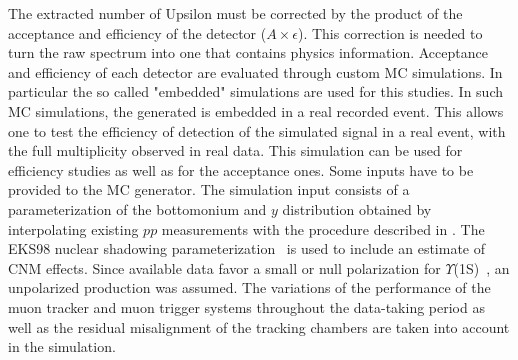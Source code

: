 The extracted number of Upsilon must be corrected by the product of the acceptance and efficiency of the detector ($A\times\epsilon$).
This correction is needed to turn the raw spectrum into one that contains physics information.
Acceptance and efficiency of each detector are evaluated through custom MC simulations.
In particular the so called "embedded" simulations are used for this studies.
In such MC simulations, the generated \upsi is embedded in a real recorded event.
This allows one to test the efficiency of detection of the simulated signal in a real event, with the full multiplicity observed in real data.
This simulation can be used for efficiency studies as well as for the acceptance ones.
Some inputs have to be provided to the MC generator.
The simulation input consists of a parameterization of the bottomonium \pt and $y$ distribution obtained by interpolating existing $pp$ measurements \cite{Acosta:2001gv,LHCb:2012aa,Khachatryan:2010zg} with the procedure described in \cite{Bossu:2011qe}.
The EKS98 nuclear shadowing parameterization~\cite{Eskola:1998df} is used to include an estimate of CNM effects.
Since available data favor a small or null polarization for $\Upsilon$(1S)~\cite{Abazov:2008aa,CDF:2011ag,Chatrchyan:2012woa}, an unpolarized production was assumed. 
The variations of the performance of the muon tracker and muon trigger systems throughout the data-taking period as well as the residual misalignment of the tracking chambers are taken into account in the simulation.

